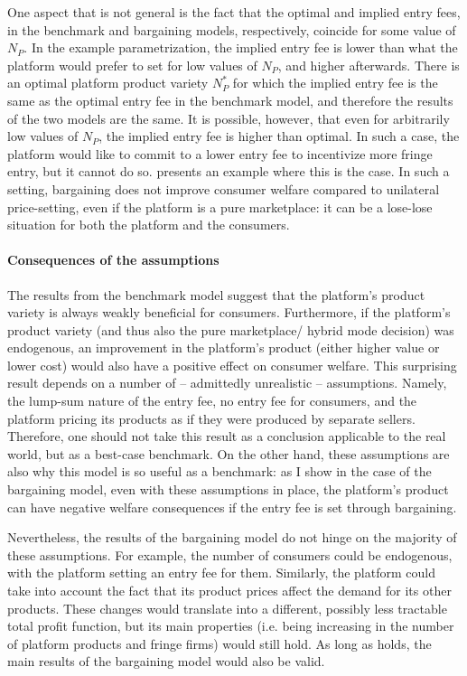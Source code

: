 \documentclass[a4paper]{article}
\begin{document}
One aspect that is not general is the fact that the optimal and implied entry fees, in the benchmark and bargaining models, respectively, coincide for some value of $N_P$.
In the example parametrization, the implied entry fee is lower than what the platform would prefer to set for low values of $N_P$, and higher afterwards.
There is an optimal platform product variety $N_P^*$ for which the implied entry fee is the same as the optimal entry fee in the benchmark model, and therefore the results of the two models are the same.
It is possible, however, that even for arbitrarily low values of $N_P$, the implied entry fee is higher than optimal.
In such a case, the platform would like to commit to a lower entry fee to incentivize more fringe entry, but it cannot do so.
 presents an example where this is the case.
In such a setting, bargaining does not improve consumer welfare compared to unilateral price-setting, even if the platform is a pure marketplace: it can be a lose-lose situation for both the platform and the consumers.


\paragraph{Consequences of the assumptions}
The results from the benchmark model suggest that the platform's product variety is always weakly beneficial for consumers.
Furthermore, if the platform's product variety (and thus also the pure marketplace/ hybrid mode decision) was endogenous, an improvement in the platform's product (either higher value or lower cost) would also have a positive effect on consumer welfare.
This surprising result depends on a number of -- admittedly unrealistic -- assumptions.
Namely, the lump-sum nature of the entry fee, no entry fee for consumers, and the platform pricing its products as if they were produced by separate sellers.
Therefore, one should not take this result as a conclusion applicable to the real world, but as a best-case benchmark.
On the other hand, these assumptions are also why this model is so useful as a benchmark: as I show in the case of the bargaining model, even with these assumptions in place, the platform's product can have negative welfare consequences if the entry fee is set through bargaining.

Nevertheless, the results of the bargaining model do not hinge on the majority of these assumptions.
For example, the number of consumers could be endogenous, with the platform setting an entry fee for them.
Similarly, the platform could take into account the fact that its product prices affect the demand for its other products.
These changes would translate into a different, possibly less tractable total profit function, but its main properties (i.e. being increasing in the number of platform products and fringe firms) would still hold.
As long as  holds, the main results of the bargaining model would also be valid.
\end{document}
